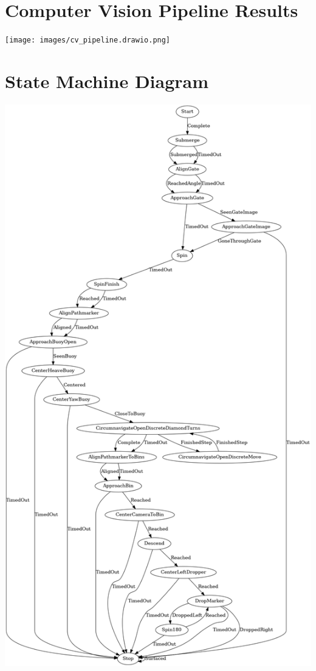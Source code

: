 \documentclass[conference]{IEEEtran}
\begin{document}
\clearpage
\appendices

\raggedbottom

\pagebreak
\section{Computer Vision Pipeline Results}


\vspace{0.5cm}
\texttt{[image: images/cv\_pipeline.drawio.png]}
\newpage
\clearpage


\section{State Machine Diagram}
\includegraphics[scale=0.27]{images/machine2.png}
\newpage
\end{document}
